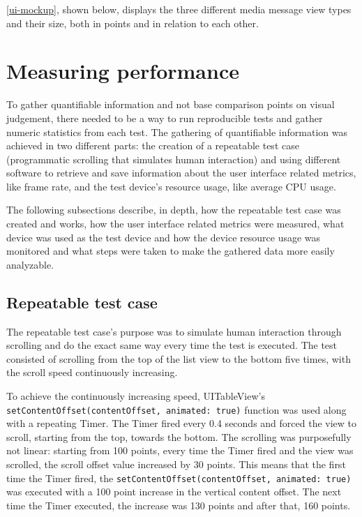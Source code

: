 \documentclass[a4paper,12pt]{article}
\begin{document}
\autoref{ui-mockup}, shown below, displays the three different media message view types and their size, both in points and in relation to each other.

\section{Measuring performance}
\label{sec:measuring-performance}
To gather quantifiable information and not base comparison points on visual judgement, there needed to be a way to run reproducible tests and gather numeric statistics from each test. The gathering of quantifiable information was achieved in two different parts: the creation of a repeatable test case (programmatic scrolling that simulates human interaction) and using different software to retrieve and save information about the user interface related metrics, like frame rate, and the test device's resource usage, like average CPU usage.

The following subsections describe, in depth, how the repeatable test case was created and works, how the user interface related metrics were measured, what device was used as the test device and how the device resource usage was monitored and what steps were taken to make the gathered data more easily analyzable. 

\subsection{Repeatable test case}
\label{subsec:repeatable-test-case}
The repeatable test case's purpose was to simulate human interaction through scrolling and do the exact same way every time the test is executed. The test consisted of scrolling from the top of the list view to the bottom five times, with the scroll speed continuously increasing.

To achieve the continuously increasing speed, UITableView's \texttt{setContentOffset(contentOffset, animated: true)} function was used along with a repeating Timer. The Timer fired every 0.4 seconds and forced the view to scroll, starting from the top, towards the bottom. The scrolling was purposefully not linear: starting from 100 points, every time the Timer fired and the view was scrolled, the scroll offset value increased by 30 points. This means that the first time the Timer fired, the \texttt{setContentOffset(contentOffset, animated: true)} was executed with a 100 point increase in the vertical content offset. The next time the Timer executed, the increase was 130 points and after that, 160 points.
\end{document}
